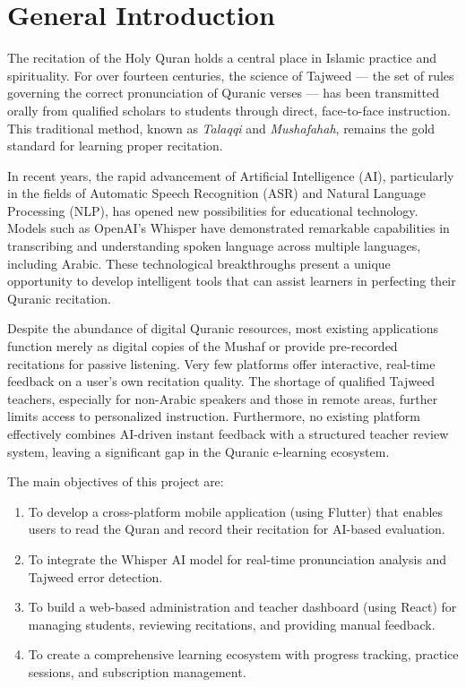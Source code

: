 \chapter*{General Introduction}
\label{ch:general_intro}

The recitation of the Holy Quran holds a central place in Islamic practice and spirituality. For over fourteen centuries, the science of Tajweed --- the set of rules governing the correct pronunciation of Quranic verses --- has been transmitted orally from qualified scholars to students through direct, face-to-face instruction. This traditional method, known as \textit{Talaqqi} and \textit{Mushafahah}, remains the gold standard for learning proper recitation.

In recent years, the rapid advancement of Artificial Intelligence (AI), particularly in the fields of Automatic Speech Recognition (ASR) and Natural Language Processing (NLP), has opened new possibilities for educational technology. Models such as OpenAI's Whisper have demonstrated remarkable capabilities in transcribing and understanding spoken language across multiple languages, including Arabic. These technological breakthroughs present a unique opportunity to develop intelligent tools that can assist learners in perfecting their Quranic recitation.

\begin{warnbox}[title=Problem Statement]
Despite the abundance of digital Quranic resources, most existing applications function merely as digital copies of the Mushaf or provide pre-recorded recitations for passive listening. Very few platforms offer interactive, real-time feedback on a user's own recitation quality. The shortage of qualified Tajweed teachers, especially for non-Arabic speakers and those in remote areas, further limits access to personalized instruction. Furthermore, no existing platform effectively combines AI-driven instant feedback with a structured teacher review system, leaving a significant gap in the Quranic e-learning ecosystem.
\end{warnbox}

The main objectives of this project are:
\begin{enumerate}
  \item To develop a cross-platform mobile application (using Flutter) that enables users to read the Quran and record their recitation for AI-based evaluation.
  \item To integrate the Whisper AI model for real-time pronunciation analysis and Tajweed error detection.
  \item To build a web-based administration and teacher dashboard (using React) for managing students, reviewing recitations, and providing manual feedback.
  \item To create a comprehensive learning ecosystem with progress tracking, practice sessions, and subscription management.
\end{enumerate}

